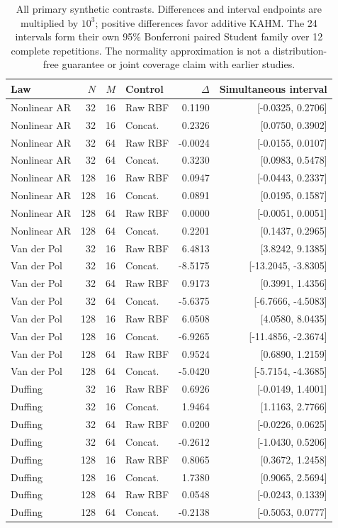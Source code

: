 \begin{table}[!htbp]
\centering\small\setlength{\tabcolsep}{4pt}
\caption{All primary synthetic contrasts. Differences and interval endpoints are multiplied by $10^3$; positive differences favor additive KAHM. The 24 intervals form their own 95\% Bonferroni paired Student family over 12 complete repetitions. The normality approximation is not a distribution-free guarantee or joint coverage claim with earlier studies.}
\label{tab:utility-intervals}
\begin{tabular}{lrrlrr}
\toprule
Law & $N$ & $M$ & Control & $\Delta$ & Simultaneous interval \\
\midrule
Nonlinear AR & 32 & 16 & Raw RBF & 0.1190 & [-0.0325, 0.2706] \\
Nonlinear AR & 32 & 16 & Concat. & 0.2326 & [0.0750, 0.3902] \\
Nonlinear AR & 32 & 64 & Raw RBF & -0.0024 & [-0.0155, 0.0107] \\
Nonlinear AR & 32 & 64 & Concat. & 0.3230 & [0.0983, 0.5478] \\
Nonlinear AR & 128 & 16 & Raw RBF & 0.0947 & [-0.0443, 0.2337] \\
Nonlinear AR & 128 & 16 & Concat. & 0.0891 & [0.0195, 0.1587] \\
Nonlinear AR & 128 & 64 & Raw RBF & 0.0000 & [-0.0051, 0.0051] \\
Nonlinear AR & 128 & 64 & Concat. & 0.2201 & [0.1437, 0.2965] \\
Van der Pol & 32 & 16 & Raw RBF & 6.4813 & [3.8242, 9.1385] \\
Van der Pol & 32 & 16 & Concat. & -8.5175 & [-13.2045, -3.8305] \\
Van der Pol & 32 & 64 & Raw RBF & 0.9173 & [0.3991, 1.4356] \\
Van der Pol & 32 & 64 & Concat. & -5.6375 & [-6.7666, -4.5083] \\
Van der Pol & 128 & 16 & Raw RBF & 6.0508 & [4.0580, 8.0435] \\
Van der Pol & 128 & 16 & Concat. & -6.9265 & [-11.4856, -2.3674] \\
Van der Pol & 128 & 64 & Raw RBF & 0.9524 & [0.6890, 1.2159] \\
Van der Pol & 128 & 64 & Concat. & -5.0420 & [-5.7154, -4.3685] \\
Duffing & 32 & 16 & Raw RBF & 0.6926 & [-0.0149, 1.4001] \\
Duffing & 32 & 16 & Concat. & 1.9464 & [1.1163, 2.7766] \\
Duffing & 32 & 64 & Raw RBF & 0.0200 & [-0.0226, 0.0625] \\
Duffing & 32 & 64 & Concat. & -0.2612 & [-1.0430, 0.5206] \\
Duffing & 128 & 16 & Raw RBF & 0.8065 & [0.3672, 1.2458] \\
Duffing & 128 & 16 & Concat. & 1.7380 & [0.9065, 2.5694] \\
Duffing & 128 & 64 & Raw RBF & 0.0548 & [-0.0243, 0.1339] \\
Duffing & 128 & 64 & Concat. & -0.2138 & [-0.5053, 0.0777] \\
\bottomrule
\end{tabular}
\end{table}
